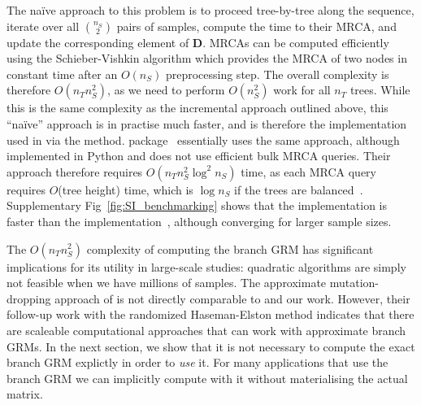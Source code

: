 The na{\"i}ve approach to this problem 
is to proceed tree-by-tree along the sequence,
iterate over all $\binom{n_S}{2}$ pairs of samples, compute the 
time to their MRCA, and update the corresponding element of $\mathbf{D}$.
MRCAs can be computed efficiently using the Schieber-Vishkin
algorithm \citep{Schieber1988On,knuth2011combinatorial}
which provides the MRCA of two nodes in constant time
after an $O(n_S)$ preprocessing step.
The overall complexity is therefore $O(n_T n_S^2)$,
as we need to perform $O(n_S^2)$ work for all $n_T$ trees.
While this is the same complexity as the incremental approach outlined
above, this ``na{\"i}ve'' approach is in practise much faster, and 
is therefore the implementation used in \tskit{} via the \tsGRM{} method.
\eGRM{} package~\citet{fan2022genealogical} essentially uses the same approach,
although implemented in Python and does not use efficient bulk MRCA queries.
Their approach therefore requires $O(n_T n_S^2 \log^2{n_S})$ time, 
as each MRCA query requires $O$(tree height) time, which is $\log n_S$
if the trees are balanced~\citep{kelleher2016efficient}.
Supplementary Fig~\ref{fig:SI_benchmarking} shows that the \tskit{} implementation 
is faster than the \eGRM{}
implementation~\citep{fan2022genealogical},
although converging for larger sample sizes.

The $O(n_T n_S^2)$ complexity of computing the branch GRM
has significant implications for its utility in large-scale studies:
quadratic algorithms are simply not feasible when we have millions 
of samples.
The approximate mutation-dropping approach of \citet{zhang2023biobank}
is not directly comparable to \citet{fan2022genealogical} and our work.
However, their follow-up work with the randomized Haseman-Elston method \citep{zhu2024variance}
indicates that there are scaleable computational approaches that can
work with approximate branch GRMs.
In the next section, we show that it is not necessary
to compute the exact branch GRM explictly in order to \emph{use} it.
For many applications that use the branch GRM we can implicitly compute with it
without materialising the actual matrix.


